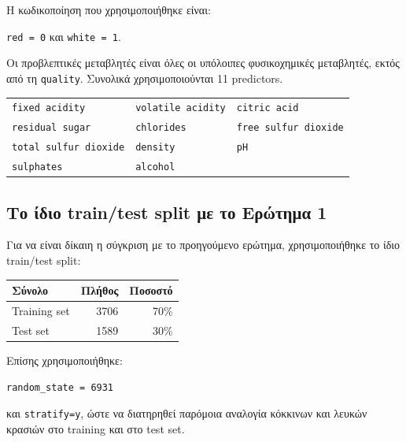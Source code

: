 \documentclass[12pt,a4paper]{article}
\newcommand{\code}[1]{\texttt{\textenglish{#1}}}
\begin{document}
Η κωδικοποίηση που χρησιμοποιήθηκε είναι:

\begin{center}
\code{red = 0} \hspace{1cm} και \hspace{1cm} \code{white = 1}.
\end{center}

Οι προβλεπτικές μεταβλητές είναι όλες οι υπόλοιπες φυσικοχημικές μεταβλητές,
εκτός από τη \code{quality}. Συνολικά χρησιμοποιούνται 11 predictors.

\begin{center}
\footnotesize
\begin{tabular}{lll}
\toprule
\code{fixed acidity} & \code{volatile acidity} & \code{citric acid} \\
\code{residual sugar} & \code{chlorides} & \code{free sulfur dioxide} \\
\code{total sulfur dioxide} & \code{density} & \code{pH} \\
\code{sulphates} & \code{alcohol} & \\
\bottomrule
\end{tabular}
\end{center}

\subsection{Το ίδιο train/test split με το Ερώτημα 1}

Για να είναι δίκαιη η σύγκριση με το προηγούμενο ερώτημα, χρησιμοποιήθηκε το
ίδιο train/test split:

\begin{center}
\begin{tabular}{lrr}
\toprule
\textbf{Σύνολο} & \textbf{Πλήθος} & \textbf{Ποσοστό} \\
\midrule
Training set & 3706 & 70\% \\
Test set & 1589 & 30\% \\
\bottomrule
\end{tabular}
\end{center}

Επίσης χρησιμοποιήθηκε:

\begin{center}
\code{random\_state = 6931}
\end{center}

και \code{stratify=y}, ώστε να διατηρηθεί παρόμοια αναλογία κόκκινων και
λευκών κρασιών στο training και στο test set.

\end{document}
